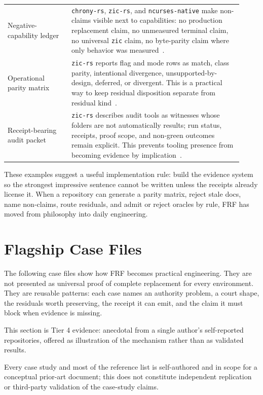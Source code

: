 \documentclass[11pt,a4paper]{article}
\newcommand{\frf}{\textsc{FRF}}
\begin{document}
\begin{longtable}{>{\raggedright\arraybackslash}p{0.25\linewidth}>{\raggedright\arraybackslash}p{0.67\linewidth}}
Negative-capability ledger & \texttt{chrony-rs}, \texttt{zic-rs}, and \texttt{ncurses-native} make non-claims visible next to capabilities: no production replacement claim, no unmeasured terminal claim, no universal \texttt{zic} claim, no byte-parity claim where only behavior was measured~\cite{chronyrs,zicrs,ncursesnative}. \\
Operational parity matrix & \texttt{zic-rs} reports flag and mode rows as match, class parity, intentional divergence, unsupported-by-design, deferred, or divergent. This is a practical way to keep residual disposition separate from residual kind~\cite{zicrs}. \\
Receipt-bearing audit packet & \texttt{zic-rs} describes audit tools as witnesses whose folders are not automatically results; run status, receipts, proof scope, and non-green outcomes remain explicit. This prevents tooling presence from becoming evidence by implication~\cite{zicrs}. \\
\bottomrule
\end{longtable}

These examples suggest a useful implementation rule: build the evidence system so the strongest impressive sentence cannot be written unless the receipts already license it. When a repository can generate a parity matrix, reject stale docs, name non-claims, route residuals, and admit or reject oracles by rule, \frf{} has moved from philosophy into daily engineering.

\section{Flagship Case Files}
\label{sec:flagship-case-files}

The following case files show how \frf{} becomes practical engineering. They are not presented as universal proof of complete replacement for every environment. They are reusable patterns: each case names an authority problem, a court shape, the residuals worth preserving, the receipt it can emit, and the claim it must block when evidence is missing.

This section is Tier 4 evidence: anecdotal from a single author's self-reported repositories, offered as illustration of the mechanism rather than as validated results.

Every case study and most of the reference list is self-authored and in scope for a conceptual prior-art document; this does not constitute independent replication or third-party validation of the case-study claims.
\end{document}
